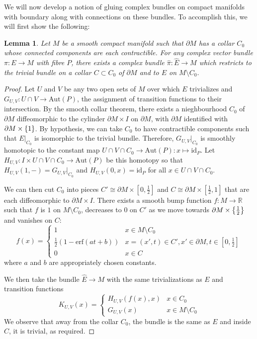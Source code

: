 \documentclass{amsart}
\newcommand{\R}{\mathbb{R}}
\newcommand{\wh}{\widehat}
\renewcommand{\to}[1][]{\stackrel{#1}{\longrightarrow}}
\renewcommand{\mapsto}{\longmapsto}
\newcommand{\id}{\text{id}}
\newcommand{\curly}[1]{\left\{ #1 \right\}}
\newcommand{\set}[2][]{\ifthenelse{\equal{#1}{}}
                                  {\curly{#2}}
                                  {\curly{#1\ \textbf{:}\ #2}}}
\newcommand{\sbr}[1]{\left[ #1 \right]}
\newcommand{\Aut}{\text{Aut}}
\numberwithin{thm}{section}
\newtheorem{lem}[thm]{Lemma}
\theoremstyle{definition}
\begin{document}
We will now develop a notion of gluing complex bundles on compact manifolds with
boundary along with connections on these bundles. To accomplish this, we will
first show the following:
\begin{lem}\label{thm:bundle_gluing}
Let $M$ be a smooth compact manifold such that $\partial M$ has
a collar $C_0$ whose connected components are each contractible. For any complex
vector bundle $\pi : E \to M$ with fibre $P$,
there exists a complex bundle $\wh{\pi} : \wh{E} \to M$ which restricts to
the trivial bundle on a collar $C \subset C_0$ of $\partial M$ and to $E$
on $M \setminus C_0$.
\end{lem}
\begin{proof}
Let $U$ and $V$ be any two open sets of $M$ over which $E$ trivializes and
$G_{U, V} : U \cap V \to \Aut(P)$, the assignment of transition functions to
their intersection.
By the smooth collar theorem, there exists a nieghbourhood $C_0$ of $\partial M$
diffeomorphic to the cylinder $\partial M \times I$ on $\partial M$,
with $\partial M$ identified with $\partial M \times \set{1}$. By hypothesis, we
can take $C_0$ to have contractible components such that $E|_{C_0}$ is
isomorphic to the trivial bundle. Therefore, $G_{U, V}|_{C_0}$ is smoothly
homotopic to the constant map $U \cap V \cap C_0 \to \Aut(P) : x \mapsto \id_P$.
Let $H_{U, V} : I \times U \cap V \cap C_0 \to \Aut(P)$ be this homotopy so that
$H_{U, V}(1, -) = G_{U, V}|_{C_0}$ and $H_{U, V}(0, x) = \id_P$ for all
$x \in U \cap V \cap C_0$.

We can then cut $C_0$ into pieces
$C' \cong \partial M \times \sbr{0, \frac{1}{2}}$ and
$C \cong \partial M \times \sbr{\frac{1}{2}, 1}$ that are each diffeomorphic to
$\partial M \times I$. There exists a smooth bump function $f : M \to \R$ such
that $f$ is $1$ on $M \setminus C_0$, decreases to $0$ on $C'$ as we move
towards $\partial M \times \set{\frac{1}{2}}$ and vanishes on $C$:
\[
  f(x) = \begin{cases}
    1 & x \in M \setminus C_0 \\
    \frac{1}{2}(1 - \text{erf}(at + b))
      & x = (x', t) \in C', x' \in \partial M, t \in \sbr{0, \frac{1}{2}} \\
    0 & x \in C
  \end{cases}
\]
where $a$ and $b$ are appropriately chosen constants.

We then take the bundle $\wh{E} \to M$ with the same trivializations as $E$
and transition functions
\[
  K_{U, V}(x) = \begin{cases}
    H_{U, V}(f(x), x) & x \in C_0 \\
    G_{U, V}(x)       & x \in M \setminus C_0
  \end{cases}
\]
We observe that away from the collar $C_0$, the bundle is the same as $E$ and
inside $C$, it is trivial, as required.
\end{proof}
\end{document}
